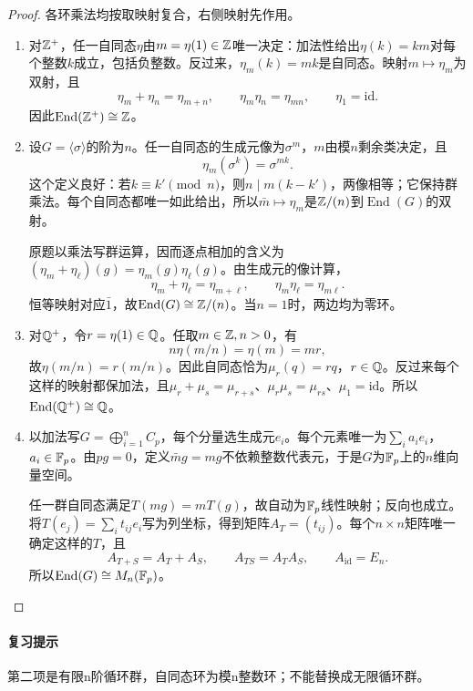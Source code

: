 \begin{proof}

各环乘法均按取映射复合，右侧映射先作用。
\begin{enumerate}[label=(\roman*)]
\item 对$\mathbb Z^+$，任一自同态$\eta$由$m=\eta(1)\in\mathbb Z$唯一决定：加法性给出$\eta(k)=km$对每个整数$k$成立，包括负整数。反过来，$\eta_m(k)=mk$是自同态。映射$m\mapsto\eta_m$为双射，且
\[
\eta_m+\eta_n=\eta_{m+n},\qquad\eta_m\eta_n=\eta_{mn},\qquad\eta_1=\mathrm{id}.
\]
因此$\operatorname{End}(\mathbb Z^+)\cong\mathbb Z$。
\item 设$G=\langle\sigma\rangle$的阶为$n$。任一自同态的生成元像为$\sigma^m$，$m$由模$n$剩余类决定，且
\[
\eta_m(\sigma^k)=\sigma^{mk}.
\]
这个定义良好：若$k\equiv k'\pmod n$，则$n\mid m(k-k')$，两像相等；它保持群乘法。每个自同态都唯一如此给出，所以$\bar m\mapsto\eta_m$是$\mathbb Z/(n)$到$\operatorname{End}(G)$的双射。

原题以乘法写群运算，因而逐点相加的含义为$(\eta_m+\eta_\ell)(g)=\eta_m(g)\eta_\ell(g)$。由生成元的像计算，
\[
\eta_m+\eta_\ell=\eta_{m+\ell},\qquad\eta_m\eta_\ell=\eta_{m\ell}.
\]
恒等映射对应$\bar1$，故$\operatorname{End}(G)\cong\mathbb Z/(n)$。当$n=1$时，两边均为零环。
\item 对$\mathbb Q^+$，令$r=\eta(1)\in\mathbb Q$。任取$m\in\mathbb Z,n>0$，有
\[
n\eta(m/n)=\eta(m)=mr,
\]
故$\eta(m/n)=r(m/n)$。因此自同态恰为$\mu_r(q)=rq$，$r\in\mathbb Q$。反过来每个这样的映射都保加法，且$\mu_r+\mu_s=\mu_{r+s}$、$\mu_r\mu_s=\mu_{rs}$、$\mu_1=\mathrm{id}$。所以$\operatorname{End}(\mathbb Q^+)\cong\mathbb Q$。
\item 以加法写$G=\bigoplus\limits_{i=1}^n C_p$，每个分量选生成元$e_i$。每个元素唯一为$\sum_i a_ie_i$，$a_i\in\mathbb F_p$。由$pg=0$，定义$\bar m g=mg$不依赖整数代表元，于是$G$为$\mathbb F_p$上的$n$维向量空间。

任一群自同态满足$T(mg)=mT(g)$，故自动为$\mathbb F_p$线性映射；反向也成立。将$T(e_j)=\sum_i t_{ij}e_i$写为列坐标，得到矩阵$A_T=(t_{ij})$。每个$n\times n$矩阵唯一确定这样的$T$，且
\[
A_{T+S}=A_T+A_S,\qquad A_{TS}=A_TA_S,\qquad A_{\mathrm{id}}=E_n.
\]
所以$\operatorname{End}(G)\cong M_n(\mathbb F_p)$。
\end{enumerate}

\end{proof}

\paragraph{复习提示}

第二项是有限n阶循环群，自同态环为模n整数环；不能替换成无限循环群。


